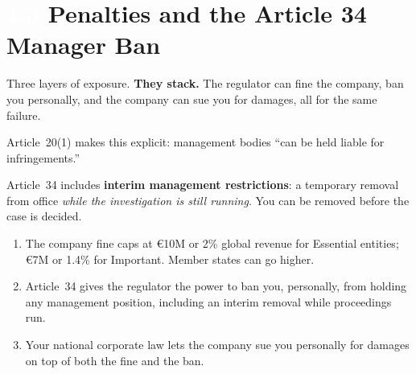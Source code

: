\documentclass[11pt,a4paper,twoside]{book}
\newcommand{\lessontag}[1]{%
  \texorpdfstring{%
    \setlength{\fboxsep}{3pt}\colorbox{nisd2blue}{\textcolor{white}{\footnotesize\bfseries #1}}\quad%
  }{Lesson #1\ }%
}
\begin{document}
\section{\lessontag{1.3}Penalties and the Article 34 Manager Ban}

\begin{center}
\end{center}

Three layers of exposure. \textbf{They stack.} The regulator can fine the company, ban you personally, and the company can sue you for damages, all for the same failure.

Article~20(1) makes this explicit: management bodies ``can be held liable for infringements.''

\begin{warningbox}
Article~34 includes \textbf{interim management restrictions}: a temporary removal from office \emph{while the investigation is still running}. You can be removed before the case is decided.
\end{warningbox}

\begin{keytakeaways}
\begin{enumerate}
  \item The company fine caps at €10M or 2\% global revenue for Essential entities; €7M or 1.4\% for Important. Member states can go higher.
  \item Article~34 gives the regulator the power to ban you, personally, from holding any management position, including an interim removal while proceedings run.
  \item Your national corporate law lets the company sue you personally for damages on top of both the fine and the ban.
\end{enumerate}
\end{keytakeaways}
\end{document}
